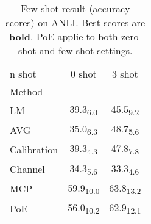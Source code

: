 \begin{table}[h]
\centering
\caption{Few-shot result (accuracy scores) on ANLI. Best scores are \textbf{bold}. PoE applie to both zero-shot and few-shot settings.}
\label{tab:few_shot}
\begin{tabular}{l|c|c}
n shot & 0 shot & 3 shot \\
Method &  &  \\
LM & 39.3\textsubscript{6.0} & 45.5\textsubscript{9.2} \\
AVG & 35.0\textsubscript{6.3} & 48.7\textsubscript{5.6} \\
Calibration & 39.3\textsubscript{4.3} & 47.8\textsubscript{7.8} \\
Channel & 34.3\textsubscript{5.6} & 33.3\textsubscript{4.6} \\
MCP & 59.9\textsubscript{10.0} & 63.8\textsubscript{13.2} \\
PoE & 56.0\textsubscript{10.2} & 62.9\textsubscript{12.1} \\
\end{tabular}
\end{table}
